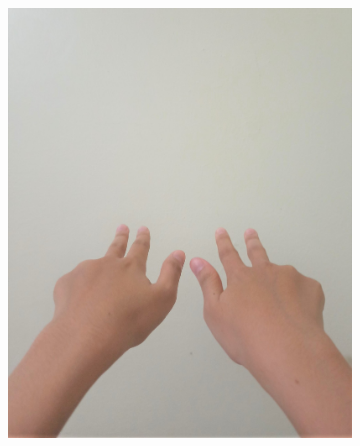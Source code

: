 \documentclass[conference]{IEEEtran}
\begin{document}
\begin{figure} [h]
\begin{center}
\begin{subfigure}[t]{0.11\textwidth}
				\includegraphics[width=\textwidth]{img/pola3b.jpg}
				\caption{\label{fig:gs3b}}
			\end{subfigure}
			\hspace{0.1em}
			\begin{subfigure}[t]{0.11\textwidth}

\end{subfigure}
\end{center}
\end{figure}
\end{document}
